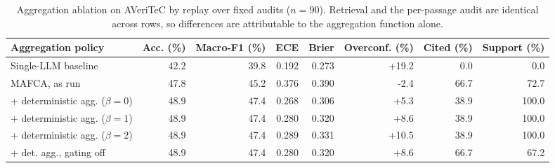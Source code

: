 
\begin{table}[t]
\centering
\caption{Aggregation ablation on AVeriTeC by replay over fixed audits ($n = 90$). Retrieval and the per-passage audit are identical across rows, so differences are attributable to the aggregation function alone.}
\label{tab:av_ablation}
\small
\begin{tabular}{@{}lrrrrrrr@{}}
\toprule
Aggregation policy & Acc. (\%) & Macro-F1 (\%) & ECE & Brier & Overconf. (\%) & Cited (\%) & Support (\%) \\
\midrule
Single-LLM baseline & 42.2 & 39.8 & 0.192 & 0.273 & +19.2 & 0.0 & 0.0 \\
MAFCA, as run & 47.8 & 45.2 & 0.376 & 0.390 & -2.4 & 66.7 & 72.7 \\
\quad + deterministic agg. ($\beta=0$) & 48.9 & 47.4 & 0.268 & 0.306 & +5.3 & 38.9 & 100.0 \\
\quad + deterministic agg. ($\beta=1$) & 48.9 & 47.4 & 0.280 & 0.320 & +8.6 & 38.9 & 100.0 \\
\quad + deterministic agg. ($\beta=2$) & 48.9 & 47.4 & 0.289 & 0.331 & +10.5 & 38.9 & 100.0 \\
\quad + det. agg., gating off & 48.9 & 47.4 & 0.280 & 0.320 & +8.6 & 66.7 & 67.2 \\
\bottomrule
\end{tabular}
\end{table}
